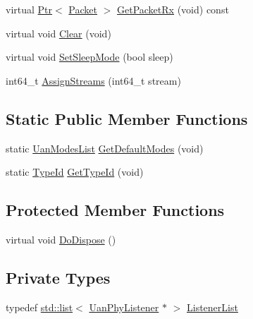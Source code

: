 \begin{DoxyCompactItemize}
\item 
virtual \hyperlink{classns3_1_1Ptr}{Ptr}$<$ \hyperlink{classns3_1_1Packet}{Packet} $>$ \hyperlink{classns3_1_1UanPhyGen_a647525fe1fbcbd844e5e1ea6759baa71}{Get\+Packet\+Rx} (void) const 
\item 
virtual void \hyperlink{classns3_1_1UanPhyGen_ad60cab9aa85ea0e48c7ed9a8e59ad81f}{Clear} (void)
\item 
virtual void \hyperlink{classns3_1_1UanPhyGen_a369ebf7fc27b40975ddf6a03f4e9c3e8}{Set\+Sleep\+Mode} (bool sleep)
\item 
int64\+\_\+t \hyperlink{classns3_1_1UanPhyGen_a42032d305c4f54f3b28357b0f8c01e4c}{Assign\+Streams} (int64\+\_\+t stream)
\end{DoxyCompactItemize}
\subsection*{Static Public Member Functions}
\begin{DoxyCompactItemize}
\item 
static \hyperlink{classns3_1_1UanModesList}{Uan\+Modes\+List} \hyperlink{classns3_1_1UanPhyGen_a6b3ea9cb37436baa774cd2c9e9852376}{Get\+Default\+Modes} (void)
\item 
static \hyperlink{classns3_1_1TypeId}{Type\+Id} \hyperlink{classns3_1_1UanPhyGen_a94d147ce22f89c46d8699ccabee242df}{Get\+Type\+Id} (void)
\end{DoxyCompactItemize}
\subsection*{Protected Member Functions}
\begin{DoxyCompactItemize}
\item 
virtual void \hyperlink{classns3_1_1UanPhyGen_a95b71d8af21c788d018e55275d6633e3}{Do\+Dispose} ()
\end{DoxyCompactItemize}
\subsection*{Private Types}
\begin{DoxyCompactItemize}
\item 
typedef \hyperlink{openflow-interface_8h_afd9bcfa176617760671b67580f536fa7}{std\+::list}$<$ \hyperlink{classns3_1_1UanPhyListener}{Uan\+Phy\+Listener} $\ast$ $>$ \hyperlink{classns3_1_1UanPhyGen_a722a10230697990a82311b46b59f777a}{Listener\+List}
\end{DoxyCompactItemize}
